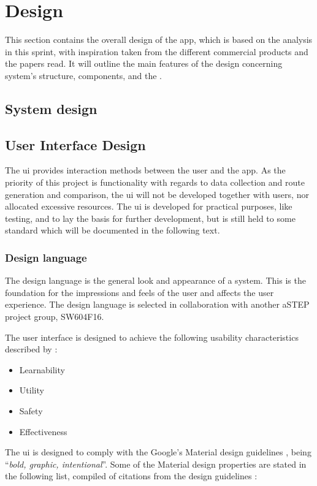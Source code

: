 \section{Design}\label{sprint1design}
This section contains the overall design of the app, which is based on the analysis in this sprint, with inspiration taken from the different commercial products and the papers read.
It will outline the main features of the design concerning system's structure, components, and the .

\subsection{System design}


\subsection{User Interface Design}
The \gls{ui} provides interaction methods between the user and the app.
As the priority of this project is functionality with regards to data collection and route generation and comparison, the \gls{ui} will not be developed together with users, nor allocated excessive resources. 
The \gls{ui} is developed for practical purposes, like testing, and to lay the basis for further development, but is still held to some standard which will be documented in the following text. 

\subsubsection{Design language}
The design language is the general look and appearance of a system.
This is the foundation for the impressions and feels of the user and affects the user experience.
The design language is selected in collaboration with another aSTEP project group, SW604F16.

The user interface is designed to achieve the following usability characteristics described by \citet{DIS2014}:
\begin{itemize}
	\item Learnability
	\item Utility
	\item Safety
	\item Effectiveness
\end{itemize}

The \gls{ui} is designed to comply with the Google's Material design guidelines \cite{materialDesign}, being ``\textit{bold, graphic, intentional}''. 
Some of the Material design properties are stated in the following list, compiled of citations from the design guidelines \cite{materialProperties}:

